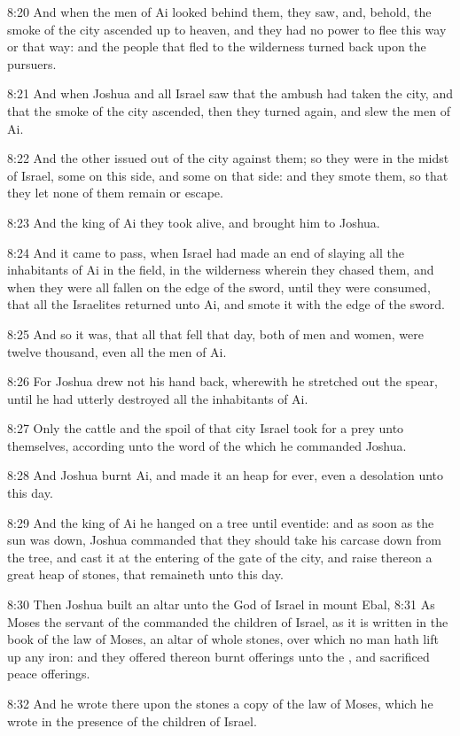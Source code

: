 8:20 And when the men of Ai looked behind them, they saw, and, behold,
the smoke of the city ascended up to heaven, and they had no power to
flee this way or that way: and the people that fled to the wilderness
turned back upon the pursuers.

8:21 And when Joshua and all Israel saw that the ambush had taken the
city, and that the smoke of the city ascended, then they turned again,
and slew the men of Ai.

8:22 And the other issued out of the city against them; so they were
in the midst of Israel, some on this side, and some on that side: and
they smote them, so that they let none of them remain or escape.

8:23 And the king of Ai they took alive, and brought him to Joshua.

8:24 And it came to pass, when Israel had made an end of slaying all
the inhabitants of Ai in the field, in the wilderness wherein they
chased them, and when they were all fallen on the edge of the sword,
until they were consumed, that all the Israelites returned unto Ai,
and smote it with the edge of the sword.

8:25 And so it was, that all that fell that day, both of men and
women, were twelve thousand, even all the men of Ai.

8:26 For Joshua drew not his hand back, wherewith he stretched out the
spear, until he had utterly destroyed all the inhabitants of Ai.

8:27 Only the cattle and the spoil of that city Israel took for a prey
unto themselves, according unto the word of the \LORD which he
commanded Joshua.

8:28 And Joshua burnt Ai, and made it an heap for ever, even a
desolation unto this day.

8:29 And the king of Ai he hanged on a tree until eventide: and as
soon as the sun was down, Joshua commanded that they should take his
carcase down from the tree, and cast it at the entering of the gate of
the city, and raise thereon a great heap of stones, that remaineth
unto this day.

8:30 Then Joshua built an altar unto the \LORD God of Israel in mount
Ebal, 8:31 As Moses the servant of the \LORD commanded the children of
Israel, as it is written in the book of the law of Moses, an altar of
whole stones, over which no man hath lift up any iron: and they
offered thereon burnt offerings unto the \LORD, and sacrificed peace
offerings.

8:32 And he wrote there upon the stones a copy of the law of Moses,
which he wrote in the presence of the children of Israel.

